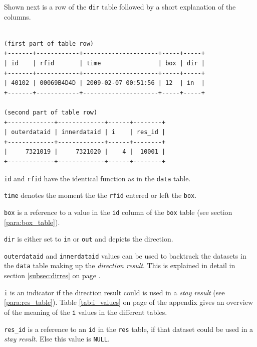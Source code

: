 Shown next is a row of the \lstinline|dir| table followed by a short explanation of the columns.

\codescript
{}
\begin{lstlisting}[frame=none]

(first part of table row)
+-------+------------+---------------------+-----+-----+
| id    | rfid       | time                | box | dir |
+-------+------------+---------------------+-----+-----+
| 40102 | 00069B4D4D | 2009-02-07 00:51:56 | 12  | in  |
+-------+------------+---------------------+-----+-----+

(second part of table row)
+-------------+-------------+------+--------+
| outerdataid | innerdataid | i    | res_id |
+-------------+-------------+------+--------+
|     7321019 |     7321020 |    4 |  10001 | 
+-------------+-------------+------+--------+
\end{lstlisting}

\begin{mydesc}
  \item \lstinline|id| and \lstinline|rfid| have the identical function as in the \lstinline|data| table.
  \item \lstinline|time| denotes the moment the the \lstinline|rfid| entered or left the \lstinline|box|.
  \item \lstinline|box| is a reference to a value in the \lstinline|id| column of the \lstinline|box| table (see section \ref{para:box_table}).
  \item \lstinline|dir| is either set to \lstinline|in| or \lstinline|out| and depicts the direction.
  \item \lstinline|outerdataid| and \lstinline|innerdataid| values can be used to backtrack the datasets in the \lstinline|data| table making up the \textit{direction result}. This is explained in detail in section \ref{subsec:dirres} on page \pageref{subsec:dirres}.
  \item \lstinline|i| is an indicator if the direction result could is used in a \textit{stay result} (see \ref{para:res_table}). Table \ref{tab:i_values} on page \pageref{tab:i_values} of the appendix gives an overview of the meaning of the \lstinline|i| values in the different tables.
  \item \lstinline|res_id| is a reference to an \lstinline|id| in the \lstinline|res| table, if that dataset could be used in a \textit{stay result}. Else this value is \lstinline|NULL|.
\end{mydesc}

